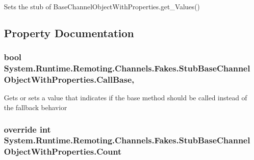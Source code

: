 Sets the stub of Base\-Channel\-Object\-With\-Properties.\-get\-\_\-\-Values()



\subsection{Property Documentation}
\hypertarget{class_system_1_1_runtime_1_1_remoting_1_1_channels_1_1_fakes_1_1_stub_base_channel_object_with_properties_a603bd5a0326fb5c9b1b78b84a1570d8e}{
\subsubsection[{Call\-Base}]{\setlength{\rightskip}{0pt plus 5cm}bool System.\-Runtime.\-Remoting.\-Channels.\-Fakes.\-Stub\-Base\-Channel\-Object\-With\-Properties.\-Call\-Base\hspace{0.3cm}{\ttfamily [get]}, {\ttfamily [set]}}}\label{class_system_1_1_runtime_1_1_remoting_1_1_channels_1_1_fakes_1_1_stub_base_channel_object_with_properties_a603bd5a0326fb5c9b1b78b84a1570d8e}


Gets or sets a value that indicates if the base method should be called instead of the fallback behavior

\hypertarget{class_system_1_1_runtime_1_1_remoting_1_1_channels_1_1_fakes_1_1_stub_base_channel_object_with_properties_a6495c2584604a8e93603c97b4f313658}{
\subsubsection[{Count}]{\setlength{\rightskip}{0pt plus 5cm}override int System.\-Runtime.\-Remoting.\-Channels.\-Fakes.\-Stub\-Base\-Channel\-Object\-With\-Properties.\-Count\hspace{0.3cm}{\ttfamily [get]}}}\label{class_system_1_1_runtime_1_1_remoting_1_1_channels_1_1_fakes_1_1_stub_base_channel_object_with_properties_a6495c2584604a8e93603c97b4f313658}


